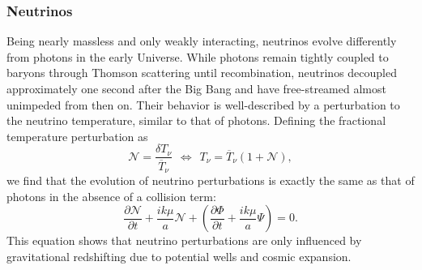 \documentclass{aa}
\numberwithin{equation}{section}
\numberwithin{table}{section}
\numberwithin{figure}{section}
\begin{document}


\subsubsection{Neutrinos}
Being nearly massless and only weakly interacting, neutrinos evolve differently from photons in the early Universe. While photons remain tightly coupled to baryons through Thomson scattering until recombination, neutrinos decoupled approximately one second after the Big Bang and have free-streamed almost unimpeded from then on. Their behavior is well-described by a perturbation to the neutrino temperature, similar to that of photons. Defining the fractional temperature perturbation as
\begin{equation}
  \mathcal{N} = \frac{\delta T_\nu}{\overline{T}_\nu} \hspace{5pt}\Leftrightarrow\hspace{5pt} T_\nu = \overline{T}_\nu (1 + \mathcal{N}),
\end{equation}
we find that the evolution of neutrino perturbations is exactly the same as that of photons in the absence of a collision term:
\begin{equation}
\frac{\partial \mathcal{N}}{\partial t} + \frac{ik\mu}{a} \mathcal{N} + \left(\frac{\partial \Phi}{\partial t} + \frac{ik\mu}{a} \Psi \right) = 0.
\end{equation}
This equation shows that neutrino perturbations are only influenced by gravitational redshifting due to potential wells and cosmic expansion. 
\end{document}
